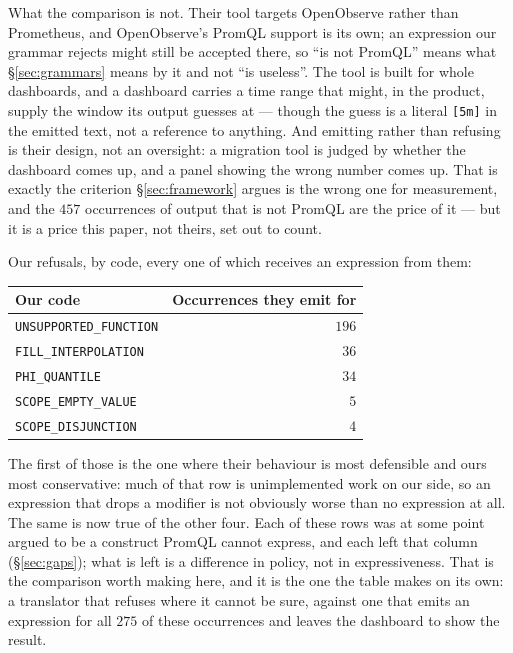 \begin{remark}
What the comparison is not. Their tool targets OpenObserve rather than Prometheus, and
OpenObserve's PromQL support is its own; an expression our grammar rejects might still be
accepted there, so ``is not PromQL'' means what \S\ref{sec:grammars} means by it and not
``is useless''. The tool is built for whole dashboards, and a dashboard carries a time
range that might, in the product, supply the window its output guesses at --- though the
guess is a literal \texttt{[5m]} in the emitted text, not a reference to anything. And
emitting rather than refusing is their design, not an oversight: a migration tool is
judged by whether the dashboard comes up, and a panel showing the wrong number comes up.
That is exactly the criterion \S\ref{sec:framework} argues is the wrong one for
measurement, and the $457$ occurrences of output that is not PromQL are the price of it
--- but it is a price this paper, not theirs, set out to count.

Our refusals, by code, every one of which receives an expression from them:

\begin{center}\footnotesize
\begin{tabular}{@{}lr@{}}
\toprule
Our code & Occurrences they emit for \\
\midrule
\texttt{UNSUPPORTED\_FUNCTION} & $196$ \\
\texttt{FILL\_INTERPOLATION} & $36$ \\
\texttt{PHI\_QUANTILE} & $34$ \\
\texttt{SCOPE\_EMPTY\_VALUE} & $5$ \\
\texttt{SCOPE\_DISJUNCTION} & $4$ \\
\bottomrule
\end{tabular}
\end{center}

\noindent
The first of those is
the one where their behaviour is most defensible and ours most conservative: much of that
row is unimplemented work on our side, so an expression that drops a modifier is not
obviously worse than no expression at all. The same is now true of the other four. Each
of these rows was at some point argued to be a construct PromQL cannot express, and each
left that column (\S\ref{sec:gaps}); what is left is a difference in policy, not in
expressiveness. That is the comparison worth making here, and it is the one the table
makes on its own: a translator that refuses where it cannot be sure, against one that
emits an expression for all $275$ of these occurrences and leaves the dashboard to show
the result.
\end{remark}
